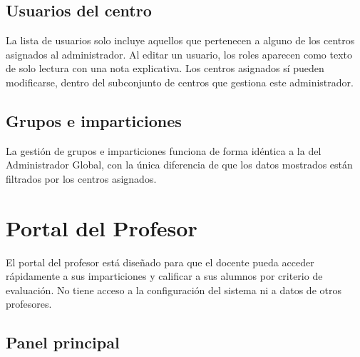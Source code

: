 \documentclass[12pt, a4paper]{report}
\begin{document}

\subsection{Usuarios del centro}

La lista de usuarios solo incluye aquellos que pertenecen a alguno de los centros
asignados al administrador. Al editar un usuario, los roles aparecen como texto
de solo lectura con una nota explicativa. Los centros asignados sí pueden modificarse,
dentro del subconjunto de centros que gestiona este administrador.



\subsection{Grupos e imparticiones}

La gestión de grupos e imparticiones funciona de forma idéntica a la del Administrador
Global, con la única diferencia de que los datos mostrados están filtrados por los
centros asignados.



\section{Portal del Profesor}

El portal del profesor está diseñado para que el docente pueda acceder rápidamente a sus
imparticiones y calificar a sus alumnos por criterio de evaluación. No tiene acceso a la
configuración del sistema ni a datos de otros profesores.

\subsection{Panel principal}
\end{document}
